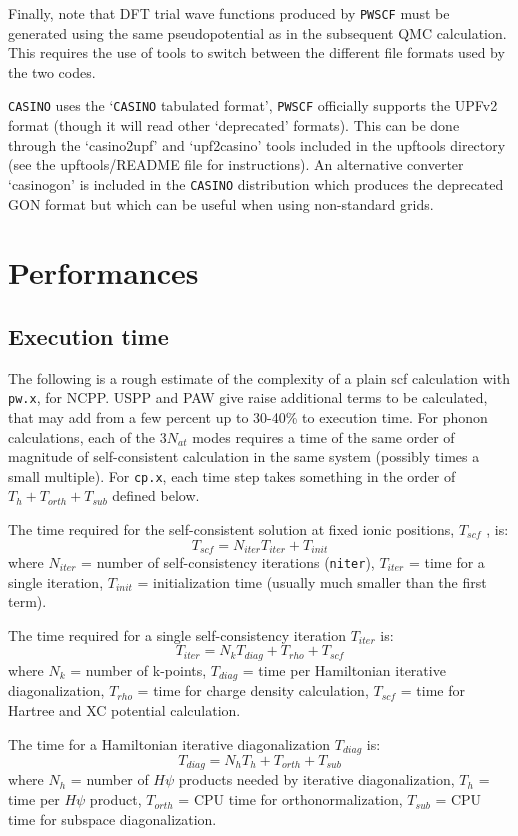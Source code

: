 \documentclass[12pt,a4paper]{article}
\def\pwx{\texttt{pw.x}}
\def\cpx{\texttt{cp.x}}
\begin{document}
Finally, note that DFT trial wave functions produced by \texttt{PWSCF}
must be generated using the same pseudopotential as in the subsequent QMC 
calculation. This requires the use of tools to switch between the different 
file formats used by the two codes.

\texttt{CASINO} uses the `\texttt{CASINO} tabulated format', \texttt{PWSCF} officially supports 
the UPFv2 format (though it will read other `deprecated' formats).
This can be done through the `casino2upf' and `upf2casino' tools included in the upftools directory (see the upftools/README file for instructions). An alternative converter `casinogon' is included in the \texttt{CASINO} distribution which produces the deprecated GON format but which can be useful when using non-standard grids.

\section{Performances}

\subsection{Execution time}

The following is a rough estimate of the complexity of a plain
scf calculation with \pwx, for NCPP. USPP and PAW 
give raise additional terms to be calculated, that may add from a 
few percent 
up to 30-40\% to execution time. For phonon calculations, each of the
$3N_{at}$ modes requires a time of the same order of magnitude of
self-consistent calculation in the same system (possibly times a small multiple). 
For \cpx, each time step takes something in the order of
$T_h + T_{orth} + T_{sub}$ defined below.

The time required for the self-consistent solution at fixed ionic
positions, $T_{scf}$ , is:
$$T_{scf} = N_{iter} T_{iter} + T_{init}$$
where $N_{iter}$  = number of self-consistency iterations (\texttt{niter}), 
$T_{iter}$ =
time for a single iteration, $T_{init}$ = initialization time
(usually much smaller than the first term).

The time required for a single self-consistency iteration $T_{iter}$ is:
$$T_{iter} = N_k T_{diag} +T_{rho} + T_{scf}$$
where $N_k$ = number of k-points, $T_{diag}$ = time per 
Hamiltonian iterative diagonalization, $T_{rho}$ = time for charge density 
calculation, $T_{scf}$ = time for Hartree and XC potential
calculation.
    
The time for a Hamiltonian iterative diagonalization $T_{diag}$ is:
$$T_{diag} = N_h T_h + T_{orth} + T_{sub}$$
where $N_h$ = number of $H\psi$ products needed by iterative diagonalization,
$T_h$ = time per $H\psi$ product, $T_{orth}$ = CPU time for 
orthonormalization, $T_{sub}$ = CPU time for subspace diagonalization.
    
\end{document}
